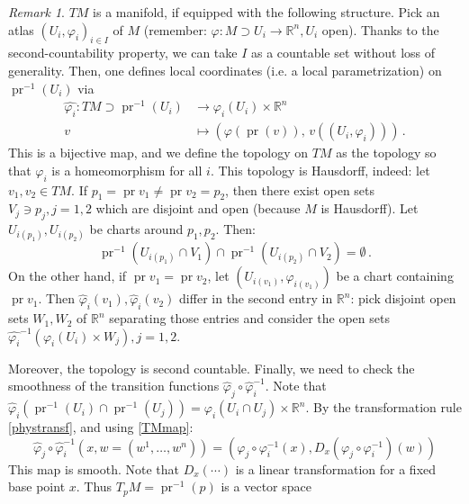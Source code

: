 \documentclass[a4paper,11pt,titlepage, article, oneside]{memoir}
\numberwithin{equation}{section}
\theoremstyle{definition}
\theoremstyle{remark}
\newtheorem{remark}[theorem]{Remark}
\DeclareMathOperator{\pr}{pr}
\newcommand{\rfield}{\mathbb{R}}
\begin{document}
\begin{remarkbox}\begin{remark}
$TM$ is a manifold, if equipped with the following structure. Pick an atlas $(U_i, \varphi_i)_{i \in I}$ of $M$ (remember: $\varphi \colon M \supset U_i \rightarrow \rfield^n, U_i$ open). Thanks to the second-countability property, we can take $I$ as a countable set without loss of generality. Then, one defines local coordinates (i.e. a local parametrization) on $\pr^{-1}(U_i)$ via
\begin{align} \label{TMmap}
\hat{\varphi_i} \colon TM \supset \pr^{-1}(U_i) &\longrightarrow \varphi_i(U_i) \times \rfield^n \\
v &\longmapsto \left ( \varphi(\pr(v)),\, v((U_i, \varphi_i)) \right ) \, . \nonumber
\end{align}
This is a bijective map, and we define the topology on $TM$ as the topology so that $\hat{\varphi_i}$ is a homeomorphism for all $i$. This topology is Hausdorff, indeed: let $v_1, v_2 \in TM$. If $p_1 = \pr v_1 \not = \pr v_2 = p_2$, then there exist open sets $V_j \ni p_j, j =1, 2$ which are disjoint and open (because $M$ is Hausdorff). Let $U_{i(p_1)}, U_{i(p_2)}$ be charts around $p_1, p_2$. Then:
\[ \pr^{-1} \left( U_{i(p_1)} \cap V_1 \right) \cap \pr^{-1} \left( U_{i(p_2)} \cap V_2 \right) = \emptyset \, . \]
On the other hand, if $\pr v_1 = \pr v_2$, let $\left( U_{i(v_1)}, \varphi_{i(v_1)} \right)$ be a chart containing $\pr v_1$. Then $\hat \varphi_i(v_1), \hat \varphi_i (v_2)$ differ in the second entry in $\rfield^n$: pick disjoint open sets $W_1, W_2$ of $\rfield^n$ separating those entries and consider the open sets $\hat{\varphi_i}^{-1} \left( \varphi_i(U_i) \times W_j \right), j =1, 2$.

Moreover, the topology is second countable. Finally, we need to check the smoothness of the transition functions $\hat \varphi_j \circ \hat \varphi_i^{-1}$. Note that $\hat \varphi_i \left( \pr^{-1}(U_i) \cap \pr^{-1}(U_j) \right) = \varphi_i (U_i \cap U_j) \times \rfield^n$. By the transformation rule \eqref{phystransf}, and using \eqref{TMmap}:
$$\hat \varphi_j \circ \hat \varphi_i^{-1} \left (x, w = (w^1, \ldots, w^n) \right) = (\varphi_j \circ \varphi_i^{-1}(x), D_x(\varphi_j \circ \varphi_i^{-1}) (w))$$
This map is smooth. Note that $D_x(\cdots)$ is a linear transformation for a fixed base point $x$. 
Thus $ T_pM = \pr^{-1}(p)$ is a vector space
\end{remark}\end{remarkbox}
\end{document}
